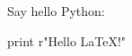 \documentclass{article}
\begin{document}
Say hello Python:

\begin{python}
print r"Hello \LaTeX!"
\end{python}
\end{document}
